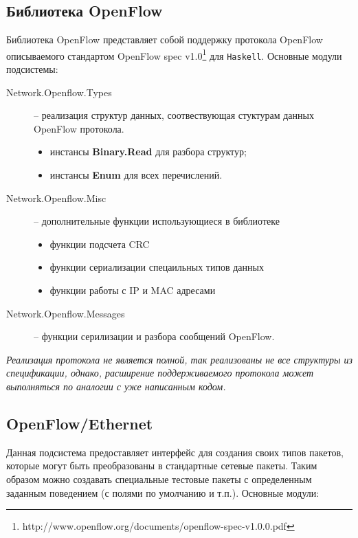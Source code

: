 \documentclass[9pt,a4paper]{article}
\begin{document}
\subsection{Библиотека OpenFlow}

Библиотека OpenFlow представляет собой поддержку протокола 
OpenFlow описываемого стандартом OpenFlow spec 
v1.0\footnote{http://www.openflow.org/documents/openflow-spec-v1.0.0.pdf}
для \texttt{Haskell}. Основные модули подсистемы:

\begin{description}
    \item[Network.Openflow.Types] -- реализация структур данных, соотвествующая
        стуктурам данных OpenFlow протокола.
        \begin{itemize}
            \item инстансы \textbf{Binary.Read} для разбора структур;
            \item инстансы \textbf{Enum} для всех перечислений.
        \end{itemize}
    \item[Network.Openflow.Misc] -- дополнительные функции использующиеся в библиотеке
        \begin{itemize}
            \item функции подсчета CRC
            \item функции сериализации спецаильных типов данных
            \item функции работы с IP и MAC адресами
        \end{itemize}
    \item[Network.Openflow.Messages] -- функции серилизации и разбора сообщений OpenFlow.
\end{description}

\emph{Реализация протокола не является полной, так реализованы не все структуры из
спецификации, однако, расширение поддерживаемого протокола может выполняться по аналогии с
уже написанным кодом.}

\subsection{OpenFlow/Ethernet}

Данная подсистема предоставляет интерфейс для создания своих типов пакетов, 
которые могут быть преобразованы в стандартные сетевые пакеты. Таким образом можно создавать
специальные тестовые пакеты с определенным заданным поведением (с полями по умолчанию и т.п.).
Основные модули:
\end{document}
